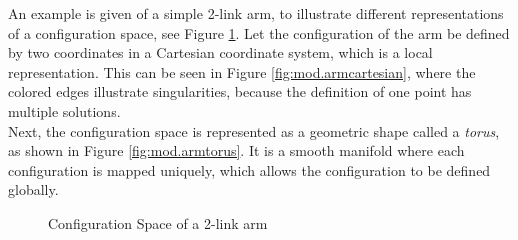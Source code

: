 
An example is given of a simple 2-link arm, to illustrate different representations of a configuration space, see Figure \ref{fig:mod.armmanifold}.
Let the configuration of the arm be defined by two coordinates in a Cartesian coordinate system, which is a local representation.
This can be seen in Figure \ref{fig:mod.armcartesian}, where the colored edges illustrate singularities, because the definition of one point has multiple solutions.\\
Next, the configuration space is represented as a geometric shape called a \textit{torus}, as shown in Figure \ref{fig:mod.armtorus}. It is a smooth manifold where each configuration is mapped uniquely, which allows the configuration to be defined globally.
\begin{figure}[h!]
	\centering
	\caption{Configuration Space of a 2-link arm\label{fig:mod.armmanifold}}
\end{figure}		

